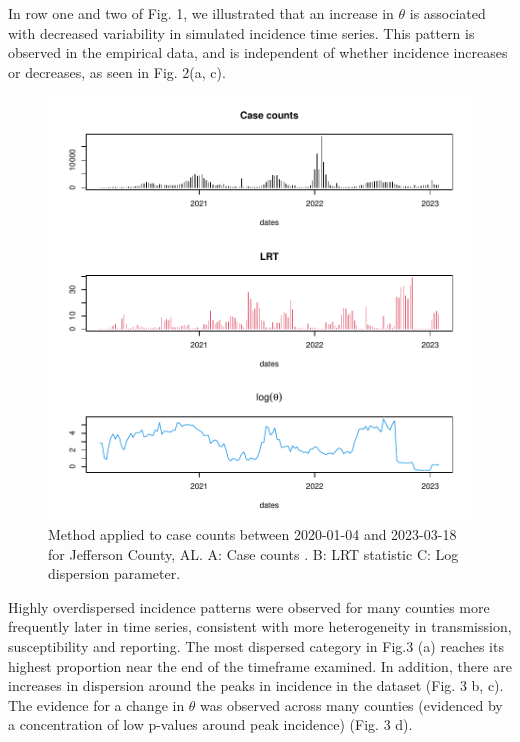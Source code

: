 \documentclass[10pt,letterpaper]{article}
\begin{document}
In row one and two of Fig. 1, we illustrated that an increase in \begin{math}\theta\end{math} is associated with decreased variability in simulated incidence time series. This pattern is observed in the empirical data, and is independent of whether incidence increases or decreases, as seen in Fig. 2(a, c).
\begin{figure}[!h]
\includegraphics[width=1\textwidth]{compare.pdf}
\caption{Method applied to case counts between 2020-01-04 and 2023-03-18
for Jefferson County, AL. A: Case counts . B: LRT statistic C: Log dispersion
parameter.
}
\label{fig2}
\end{figure}

\noindent Highly overdispersed incidence patterns were observed for many counties more frequently later in time series, consistent with more heterogeneity in transmission, susceptibility and reporting. 
The most dispersed category in Fig.3 (a) reaches its highest proportion near the end of the timeframe examined.
In addition, there are increases in dispersion around the peaks in incidence in the dataset (Fig. 3 b, c).
The evidence for a change in \begin{math}\theta\end{math} was observed across many counties (evidenced by a concentration of low p-values around peak incidence) (Fig. 3 d).
\end{document}
